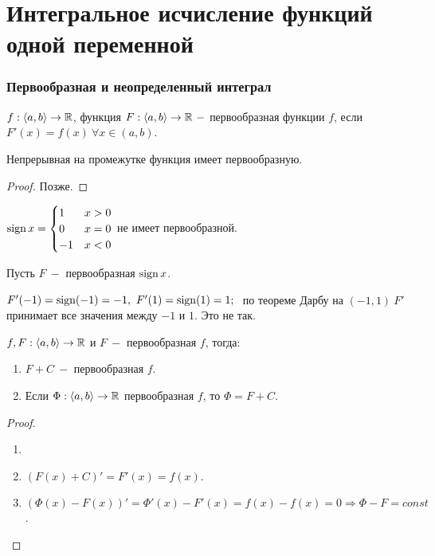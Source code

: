 \part{Интегральное исчисление функций одной переменной}
\section{Первообразная и неопределенный интеграл}

\begin{definition}
    $f:\langle a,b \rangle \rightarrow \mathbb{R}$, функция $F:\langle a,b \rangle \rightarrow \mathbb{R}\ -$ первообразная функции $f$, если $F'(x)=f(x)\ \forall x\in (a,b)$.
\end{definition}

\begin{theorem}
    Непрерывная на промежутке функция имеет первообразную.
\end{theorem}

\begin{proof}
    Позже.
\end{proof}

\begin{remark}
    $\operatorname{sign} x = \begin{cases}
        1 &\text{$x>0$} \\
        0 &\text{$x=0$} \\
        -1 &\text{$x<0$} 
    \end{cases}$ не имеет первообразной.

    Пусть $F\ -$ первообразная $\operatorname{sign} x$.

    $F'(-1)=\operatorname{sign} (-1) = -1,\ F'(1)=\operatorname{sign} (1) = 1;\ $ по теореме Дарбу на $(-1,1)\ F'$ принимает все значения между $-1$ и $1$. Это не так.
\end{remark}

\begin{theorem}
    $f,F:\langle a,b \rangle \rightarrow \mathbb{R}$ и $F\ -$ первообразная $f$, тогда:
    \begin{enumerate}
        \item $F+C\ -$ первообразная $f$.
        \item Если $\Phi:\langle a,b \rangle \rightarrow \mathbb{R}$ первообразная $f$, то $\Phi=F+C$.
    \end{enumerate}
\end{theorem}
    
\begin{proof}
    \begin{enumerate}
        \item[]
        \item $(F(x)+C)'=F'(x)=f(x)$.
        \item $(\Phi(x)-F(x))'=\Phi'(x)-F'(x)=f(x)-f(x)=0\Rightarrow \Phi - F=const$.
    \end{enumerate}
\end{proof}

